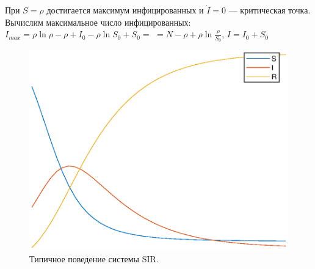 При $S=\rho$ достигается максимум инфицированных и $\dot{I} = 0$ --- критическая точка. Вычислим максимальное число инфицированных: $I_{max} = \rho \ln{\rho} - \rho + I_0-\rho \ln{S_0} +S_0 =$ $= N-\rho +\rho \ln{\frac{\rho}{S_0}}$, $I = I_0 + S_0$ 
\begin{figure}[H]
	\begin{center}
		\includegraphics[width=0.7\linewidth]{ch11/SIR_graph.eps}
	\end{center}
	\caption{Типичное поведение системы SIR.}
\end{figure}

